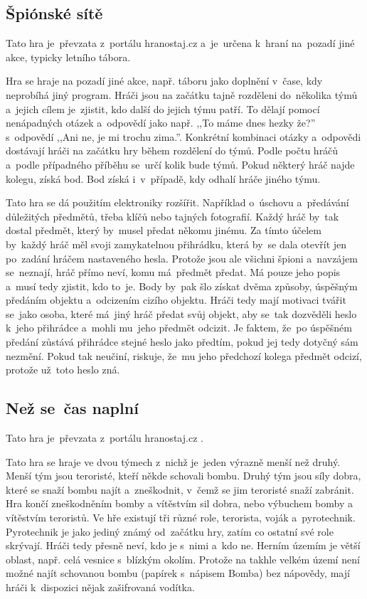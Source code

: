 \vspace{-2mm}
\subsection{Špiónské sítě \label{SpionskeSite}}
Tato hra je~převzata z~portálu hranostaj.cz \cite{SpionskeSite} a~je~určena k~hraní na~pozadí jiné akce, typicky letního tábora.

Hra se hraje na pozadí jiné akce, např. táboru jako doplnění v~čase, kdy neprobíhá jiný program.
Hráči jsou na začátku tajně rozděleni do~několika týmů a~jejich cílem je~zjistit, kdo další do jejich týmu patří.
To dělají pomocí nenápadných otázek a~odpovědí jako např. ,,To máme dnes hezky že?'' s~odpovědí ,,Ani ne, je mi trochu zima.''.
Konkrétní kombinaci otázky a~odpovědi dostávají hráči na začátku hry během rozdělení do týmů.
Podle počtu hráčů a~podle případného příběhu se~určí kolik bude týmů.
Pokud některý hráč najde kolegu, získá bod.
Bod získá i~v~případě, kdy odhalí hráče jiného týmu.

Tato hra se dá použitím elektroniky rozšířit.
Například o~úschovu a~předávání důležitých předmětů, třeba klíčů nebo tajných fotografií.
Každý hráč by~tak dostal předmět, který by~musel předat někomu jinému.
Za tímto účelem by~každý hráč měl svoji zamykatelnou přihrádku, která by~se dala otevřít jen po~zadání hráčem nastaveného hesla.
Protože jsou ale všichni špioni a~navzájem se~neznají, hráč přímo neví, komu má~předmět předat.
Má pouze jeho popis a~musí tedy zjistit, kdo to~je.
Body by~pak šlo získat dvěma způsoby, úspěšným předáním objektu a~odcizením cizího objektu.
Hráči tedy mají motivaci tvářit se~jako osoba, které má~jiný hráč předat svůj objekt, aby se~tak dozvěděli heslo k~jeho přihrádce a~mohli mu~jeho předmět odcizit.
Je faktem, že~po úspěšném předání zůstává přihrádce stejné heslo jako předtím, pokud jej tedy dotyčný sám nezmění.
Pokud tak neučiní, riskuje, že~mu jeho předchozí kolega předmět odcizí, protože už~toto heslo zná.

\vspace{-2mm}
\subsection{Než se~čas naplní}
Tato hra je~převzata z~portálu hranostaj.cz \cite{NezSeCasNaplni}.

Tato hra se hraje ve dvou týmech z~nichž je~jeden výrazně menší než druhý.
Menší tým jsou teroristé, kteří někde schovali bombu.
Druhý tým jsou síly dobra, které se snaží bombu najít a~zneškodnit, v~čemž se jim teroristé snaží zabránit.
Hra končí zneškodněním bomby a vítěstvím sil dobra, nebo výbuchem bomby a vítěstvím teroristů.
Ve hře existují tři různé role, terorista, voják a~pyrotechnik.
Pyrotechnik je jako jediný známý od~začátku hry, zatím co ostatní své role skrývají.
Hráči tedy přesně neví, kdo je s~nimi a~kdo ne.
Herním územím je větší oblast, např. celá vesnice s~blízkým okolím.
Protože na takhle velkém území není možné najít schovanou bombu (papírek s~nápisem Bomba) bez nápovědy, mají hráči k~dispozici nějak zašifrovaná vodítka.

